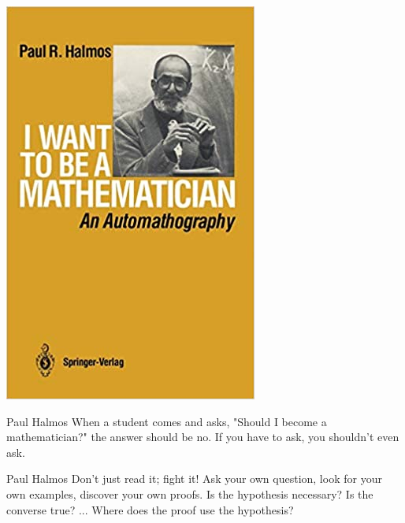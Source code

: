 %
\begin{boxResource}[lefthand width=5cm, sidebyside]{}
\includegraphics[width=\textwidth]{./img/Halmos_Mathematician}
\tcblower
\begin{boxQuote}{Paul Halmos}
    When a student comes and asks, "Should I become a mathematician?" the answer should be no.
    If you have to ask, you shouldn't even ask.
\end{boxQuote}
    \begin{boxQuote}{Paul Halmos}
    Don't just read it; fight it!
    Ask your own question, look for your own examples, discover your own proofs.
    Is the hypothesis necessary?
    Is the converse true?
    ... Where does the proof use the hypothesis?
    \end{boxQuote}
\end{boxResource}
%
